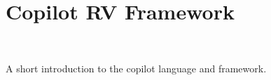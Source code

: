 \section{Copilot RV Framework}~\label{sec:Copilot}

A short introduction to the copilot language and framework.


